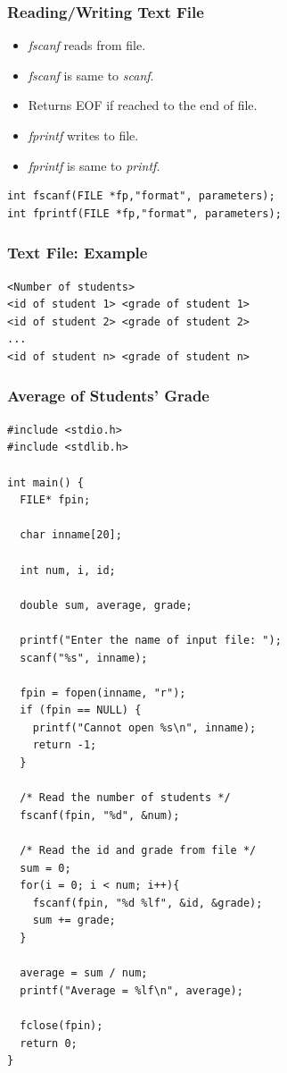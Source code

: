 \documentclass{../c-lecture}
\begin{document}
\begin{frame}[fragile]
  \frametitle{Reading/Writing Text File}
  \begin{itemize}
    \item \textit{\color{YellowOrange} fscanf} reads from file.
    \item
      \textit{\color{YellowOrange}fscanf} is same to
      \textit{\color{LimeGreen} scanf}.

    \item Returns EOF if reached to the end of file.
    \item \textit{\color{Cyan} fprintf} writes to file.
    \item
      \textit{\color{Cyan} fprintf} is same to
      \textit{\color{Violet} printf}.

  \end{itemize}
  \begin{verbatim}
int fscanf(FILE *fp,"format", parameters);
int fprintf(FILE *fp,"format", parameters);
  \end{verbatim}
\end{frame}

\begin{frame}[fragile]
  \frametitle{Text File: Example}
  \begin{verbatim}
<Number of students>
<id of student 1> <grade of student 1>
<id of student 2> <grade of student 2>
...
<id of student n> <grade of student n>
  \end{verbatim}
\end{frame}

\begin{frame}[fragile]
  \frametitle{Average of Students' Grade}
  \scriptsize
  \begin{verbatim}
#include <stdio.h>
#include <stdlib.h>

int main() {
  FILE* fpin;

  char inname[20];

  int num, i, id;

  double sum, average, grade;

  printf("Enter the name of input file: ");
  scanf("%s", inname);

  fpin = fopen(inname, "r");
  if (fpin == NULL) {
    printf("Cannot open %s\n", inname);
    return -1;
  }

  /* Read the number of students */
  fscanf(fpin, "%d", &num);

  /* Read the id and grade from file */
  sum = 0;
  for(i = 0; i < num; i++){
    fscanf(fpin, "%d %lf", &id, &grade);
    sum += grade;
  }

  average = sum / num;
  printf("Average = %lf\n", average);

  fclose(fpin);
  return 0;
}
  \end{verbatim}
\end{frame}
\end{document}
